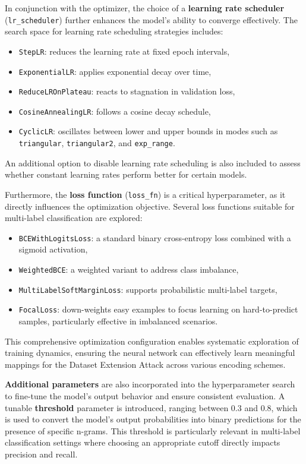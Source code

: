 In conjunction with the optimizer, the choice of a \textbf{learning rate scheduler} (\texttt{lr\_scheduler}) further enhances the model's ability to converge effectively.
The search space for learning rate scheduling strategies includes:
\begin{itemize}
    \item \texttt{StepLR}: reduces the learning rate at fixed epoch intervals,
    \item \texttt{ExponentialLR}: applies exponential decay over time,
    \item \texttt{ReduceLROnPlateau}: reacts to stagnation in validation loss,
    \item \texttt{CosineAnnealingLR}: follows a cosine decay schedule,
    \item \texttt{CyclicLR}: oscillates between lower and upper bounds in modes such as \texttt{triangular}, \texttt{triangular2}, and \texttt{exp\_range}.
\end{itemize}
An additional option to disable learning rate scheduling is also included to assess whether constant learning rates perform better for certain models.

Furthermore, the \textbf{loss function} (\texttt{loss\_fn}) is a critical hyperparameter, as it directly influences the optimization objective.
Several loss functions suitable for multi-label classification are explored:
\begin{itemize}
    \item \texttt{BCEWithLogitsLoss}: a standard binary cross-entropy loss combined with a sigmoid activation,
    \item \texttt{WeightedBCE}: a weighted variant to address class imbalance,
    \item \texttt{MultiLabelSoftMarginLoss}: supports probabilistic multi-label targets,
    \item \texttt{FocalLoss}: down-weights easy examples to focus learning on hard-to-predict samples, particularly effective in imbalanced scenarios.
\end{itemize}

This comprehensive optimization configuration enables systematic exploration of training dynamics, ensuring the neural network can effectively learn meaningful mappings for the Dataset Extension Attack across various encoding schemes.

\textbf{Additional parameters} are also incorporated into the hyperparameter search to fine-tune the model's output behavior and ensure consistent evaluation.
A tunable \textbf{threshold} parameter is introduced, ranging between 0.3 and 0.8, which is used to convert the model's output probabilities into binary predictions for the presence of specific n-grams.
This threshold is particularly relevant in multi-label classification settings where choosing an appropriate cutoff directly impacts precision and recall.

